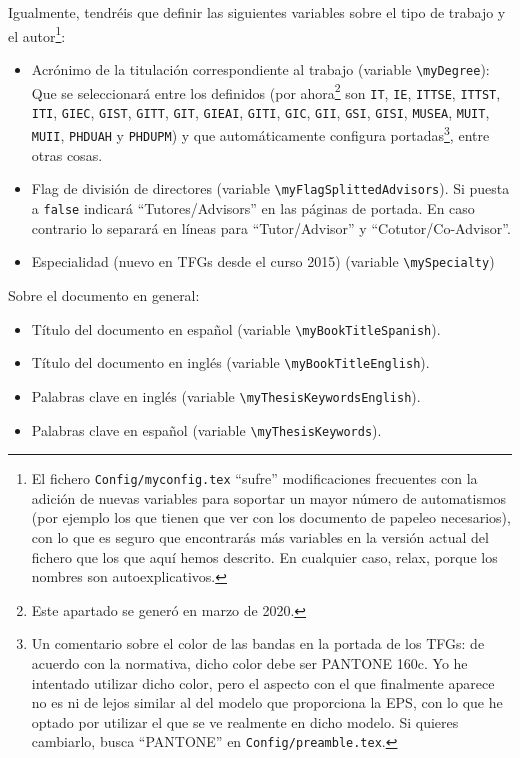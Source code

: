 Igualmente, tendréis que definir las siguientes variables sobre el tipo de trabajo y el autor\footnote{El fichero  \texttt{Config/myconfig.tex} ``sufre'' modificaciones frecuentes con la adición de nuevas variables para soportar un mayor número de automatismos (por ejemplo los que tienen que ver con los documento de papeleo necesarios), con lo que es seguro que encontrarás más variables en la versión actual del fichero que los que aquí hemos descrito. En cualquier caso, relax, porque los nombres son autoexplicativos.}:

\begin{itemize}
  \item Acrónimo de la titulación correspondiente al trabajo (variable \texttt{\textbackslash{}myDegree}): Que se seleccionará entre los definidos (por ahora\footnote{Este apartado se generó en marzo de 2020.} son \texttt{IT}, \texttt{IE}, \texttt{ITTSE}, \texttt{ITTST}, \texttt{ITI}, \texttt{GIEC}, \texttt{GIST}, \texttt{GITT}, \texttt{GIT}, \texttt{GIEAI}, \texttt{GITI}, \texttt{GIC}, \texttt{GII}, \texttt{GSI}, \texttt{GISI}, \texttt{MUSEA}, \texttt{MUIT}, \texttt{MUII}, \texttt{PHDUAH} y \texttt{PHDUPM}) y que automáticamente configura portadas\footnote{Un comentario sobre el color de las bandas en la portada de los TFGs: de acuerdo con la normativa, dicho color debe ser PANTONE 160c. Yo he intentado utilizar dicho color, pero el aspecto con el que finalmente aparece no es ni de lejos similar al del modelo que proporciona la EPS, con lo que he optado por utilizar el que se ve realmente en dicho modelo. Si quieres cambiarlo, busca ``PANTONE'' en \texttt{Config/preamble.tex}.}, entre otras cosas.

  \item Flag de división de directores (variable \texttt{\textbackslash{}myFlagSplittedAdvisors}). Si puesta a \texttt{false} indicará ``Tutores/Advisors'' en las páginas de portada. En caso contrario lo separará en líneas para ``Tutor/Advisor'' y ``Cotutor/Co-Advisor''.

  \item Especialidad (nuevo en TFGs desde el curso 2015) (variable \texttt{\textbackslash{}mySpecialty})

\end{itemize}

Sobre el documento en general:

\begin{itemize}
  \item Título del documento en español (variable \texttt{\textbackslash{}myBookTitleSpanish}).
  \item Título del documento en inglés (variable \texttt{\textbackslash{}myBookTitleEnglish}).
  \item Palabras clave en inglés (variable \texttt{\textbackslash{}myThesisKeywordsEnglish}).
  \item Palabras clave en español (variable \texttt{\textbackslash{}myThesisKeywords}).


\end{itemize}

